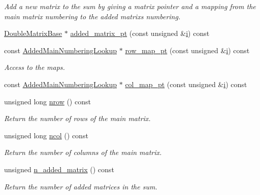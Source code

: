 \begin{DoxyCompactItemize}
\begin{DoxyCompactList}\small\item\em Add a new matrix to the sum by giving a matrix pointer and a mapping from the main matrix numbering to the added matrix\textquotesingle{}s numbering. \end{DoxyCompactList}\item 
\hyperlink{classoomph_1_1DoubleMatrixBase}{Double\+Matrix\+Base} $\ast$ \hyperlink{classoomph_1_1SumOfMatrices_a4d305ca67acad2600f833accd4acf982}{added\+\_\+matrix\+\_\+pt} (const unsigned \&\hyperlink{cfortran_8h_adb50e893b86b3e55e751a42eab3cba82}{i}) const
\item 
const \hyperlink{classoomph_1_1AddedMainNumberingLookup}{Added\+Main\+Numbering\+Lookup} $\ast$ \hyperlink{classoomph_1_1SumOfMatrices_a502c316c8fc583a15ff52d025fb45e5e}{row\+\_\+map\+\_\+pt} (const unsigned \&\hyperlink{cfortran_8h_adb50e893b86b3e55e751a42eab3cba82}{i}) const
\begin{DoxyCompactList}\small\item\em Access to the maps. \end{DoxyCompactList}\item 
const \hyperlink{classoomph_1_1AddedMainNumberingLookup}{Added\+Main\+Numbering\+Lookup} $\ast$ \hyperlink{classoomph_1_1SumOfMatrices_ac9fbec5f36f904c4fee889fb0f628c2f}{col\+\_\+map\+\_\+pt} (const unsigned \&\hyperlink{cfortran_8h_adb50e893b86b3e55e751a42eab3cba82}{i}) const
\item 
unsigned long \hyperlink{classoomph_1_1SumOfMatrices_a5d3b790f7e4f1bce927ecfb61844a52a}{nrow} () const
\begin{DoxyCompactList}\small\item\em Return the number of rows of the main matrix. \end{DoxyCompactList}\item 
unsigned long \hyperlink{classoomph_1_1SumOfMatrices_ad18b4591850b5e89ee6695407aaeec54}{ncol} () const
\begin{DoxyCompactList}\small\item\em Return the number of columns of the main matrix. \end{DoxyCompactList}\item 
unsigned \hyperlink{classoomph_1_1SumOfMatrices_a4b75af475c7e1d9d7e5a66065895abe7}{n\+\_\+added\+\_\+matrix} () const
\begin{DoxyCompactList}\small\item\em Return the number of added matrices in the sum. \end{DoxyCompactList}\item 

\end{DoxyCompactItemize}
